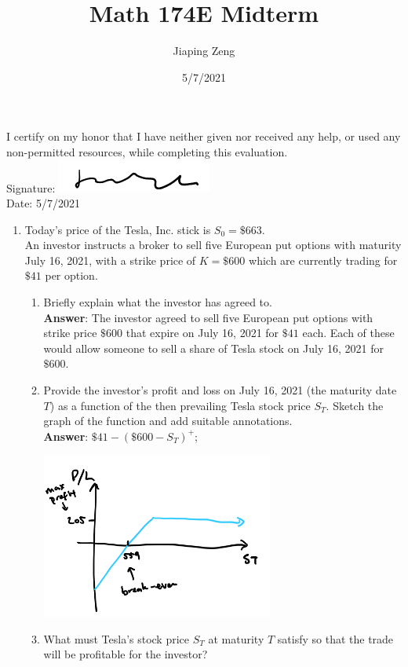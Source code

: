 \documentclass{article}
\title{Math 174E Midterm}
\date{5/7/2021}
\author{Jiaping Zeng}
\begin{document}

I certify on my honor that I have neither given nor received any help, or used any non-permitted resources, while completing this evaluation.\\
Signature: \includegraphics[width=2in]{signature.png}\\
Date: 5/7/2021
\newpage
\begin{enumerate}
      \item Today's price of the Tesla, Inc. stick is $S_0=\$663$.\\An investor instructs a broker to sell five European put options with maturity July 16, 2021, with a strike price of $K=\$600$ which are currently trading for $\$41$ per option.
            \begin{enumerate}
                  \item Briefly explain what the investor has agreed to.\\
                        \textbf{Answer}: The investor agreed to sell five European put options with strike price $\$600$ that expire on July 16, 2021 for $\$41$ each. Each of these would allow someone to sell a share of Tesla stock on July 16, 2021 for $\$600$.
                  \item Provide the investor's profit and loss on July 16, 2021 (the maturity date $T$) as a function of the then prevailing Tesla stock price $S_T$. Sketch the graph of the function and add suitable annotations.\\
                        \textbf{Answer}: $\$41-(\$600-S_T)^+$;
                        \begin{center}
                              \includegraphics[width=3in]{1c.png}
                        \end{center}
                  \item What must Tesla's stock price $S_T$ at maturity $T$ satisfy so that the trade will be profitable for the investor?\\

\end{enumerate}
\end{enumerate}
\end{document}

